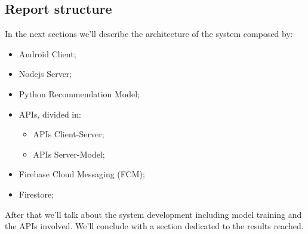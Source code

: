 \documentclass[../../main]{subfiles}
\begin{document}
\subsection{Report structure}
In the next sections we'll describe the architecture of the system composed by:
\begin{itemize}
    \item Android Client;
    \item Nodejs Server;
    \item Python Recommendation Model;
    \item APIs, divided in:
    \begin{itemize}
        \item APIs Client-Server;
        \item APIs Server-Model;
    \end{itemize}
    \item Firebase Cloud Messaging (FCM);
    \item Firestore;
\end{itemize} 
After that we'll talk about the system development including model training and the APIs involved.
We'll conclude with a section dedicated to the results reached.
\end{document}
